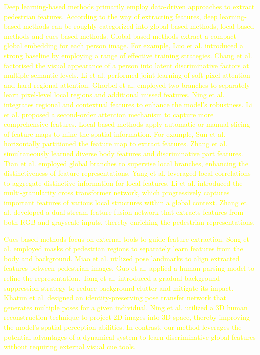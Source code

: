 \documentclass[12pt]{spieman}  %
\begin{document}
\begin{spacing}{2}
		\textcolor{yellow}{Deep learning-based methods primarily employ data-driven approaches to extract pedestrian features. According to the way of extracting features, deep learning-based methods can be roughly categorized into global-based methods, local-based methods and cues-based methods. Global-based methods extract a compact global embedding for each person image. For example, Luo et al. \cite{luo2019bag} introduced a strong baseline by employing a range of effective training strategies. Chang et al. \cite{chang2018multi}  factorised the visual appearance of a person into latent discriminative factors at multiple semantic levels. Li et al. \cite{li2018harmonious} performed joint learning of soft pixel attention and hard regional attention. Ghorbel et al. \cite{ghorbel2022masking} employed two branches to separately learn pixel-level local regions and additional missed features. Ning et al. \cite{ning2024enhancement} integrates regional and contextual features to enhance the model's robustness. Li et al. \cite{li2024occlusion} proposed a second-order attention mechanism to capture more comprehensive features.
		Local-based methods apply automatic or manual slicing of feature maps to mine the spatial information. For example, Sun et al. \cite{sun2018beyond} horizontally partitioned the feature map to extract features. Zhang et al. \cite{zhang2021appearance} simultaneously learned diverse body features and discriminative part features. Tian et al. \cite{tian2023self} employed global branches to supervise local branches, enhancing the distinctiveness of feature representations. Yang et al. \cite{yan2023part} leveraged local correlations to aggregate distinctive information for local features. Li et al. \cite{li2024multi} introduced the multi-granularity cross transformer network, which progressively captures important features of various local structures within a global context. Zhang et al. \cite{zhang2024dual} developed a dual-stream feature fusion network that extracts features from both RGB and grayscale inputs, thereby enriching the pedestrian representations.}

		\textcolor{yellow}{Cues-based methods focus on external tools to guide feature extraction. Song et al. \cite{song2018mask} employed masks of pedestrian regions to separately learn features from the body and background. Miao et al. \cite{miao2019pose} utilized pose landmarks to align extracted features between pedestrian images. Guo et al. \cite{guo2019beyond} applied a human parsing model to refine the representation. Tang et al. \cite{tang2020person} introduced a gradual background suppression strategy to reduce background clutter and mitigate its impact. Khatun et al. \cite{khatun2023pose} designed an identity-preserving pose transfer network that generates multiple poses for a given individual. Ning et al. \cite{ning20253d} utilized a 3D human reconstruction technique to project 2D images into 3D space, thereby improving the model's spatial perception abilities. In contrast, our method leverages the potential advantages of a dynamical system to learn discriminative global features without requiring external visual cue tools. }
		

\end{spacing}
\end{document}
